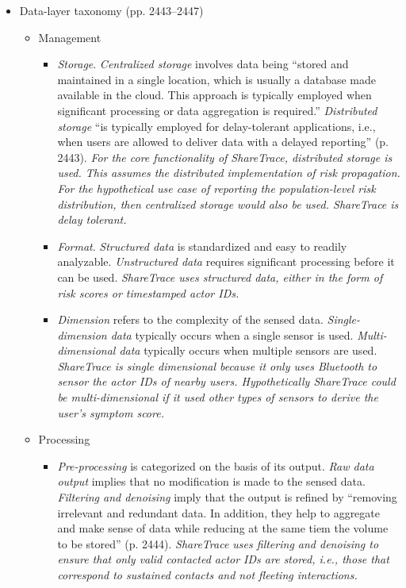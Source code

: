 \begin{itemize}
\begin{itemize}
\begin{itemize}
			\end{itemize}
		\end{itemize}
	\item Data-layer taxonomy (pp. 2443--2447)
		\begin{itemize}
		\item Management
			\begin{itemize}
			\item \emph{Storage}. \emph{Centralized storage} involves data being ``stored and maintained in a single location, which is usually a database made available in the cloud. This approach is typically employed when significant processing or data aggregation is required.'' \emph{Distributed storage} ``is typically employed for delay-tolerant applications, i.e., when users are allowed to deliver data with a delayed reporting'' (p. 2443). \emph{For the core functionality of ShareTrace, distributed storage is used. This assumes the distributed implementation of risk propagation. For the hypothetical use case of reporting the population-level risk distribution, then centralized storage would also be used. ShareTrace is delay tolerant.}
			\item \emph{Format}. \emph{Structured data} is standardized and easy to readily analyzable. \emph{Unstructured data} requires significant processing before it can be used. \emph{ShareTrace uses structured data, either in the form of risk scores or timestamped actor IDs.}
			\item \emph{Dimension} refers to the complexity of the sensed data. \emph{Single-dimension data} typically occurs when a single sensor is used. \emph{Multi-dimensional data} typically occurs when multiple sensors are used. \emph{ShareTrace is single dimensional because it only uses Bluetooth to sensor the actor IDs of nearby users. Hypothetically ShareTrace could be multi-dimensional if it used other types of sensors to derive the user's symptom score.}
			\end{itemize}
		\item Processing
			\begin{itemize}
			\item \emph{Pre-processing} is categorized on the basis of its output. \emph{Raw data output} implies that no modification is made to the sensed data. \emph{Filtering and denoising} imply that the output is refined by ``removing irrelevant and redundant data. In addition, they help to aggregate and make sense of data while reducing at the same tiem the volume to be stored'' (p. 2444). \emph{ShareTrace uses filtering and denoising to ensure that only valid contacted actor IDs are stored, i.e., those that correspond to sustained contacts and not fleeting interactions.}

\end{itemize}
\end{itemize}
\end{itemize}
